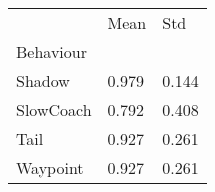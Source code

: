 \begin{tabular}{lll}
\toprule
{} &  Mean &   Std \\
Behaviour &       &       \\
\midrule
Shadow    & 0.979 & 0.144 \\
SlowCoach & 0.792 & 0.408 \\
Tail      & 0.927 & 0.261 \\
Waypoint  & 0.927 & 0.261 \\
\bottomrule
\end{tabular}
